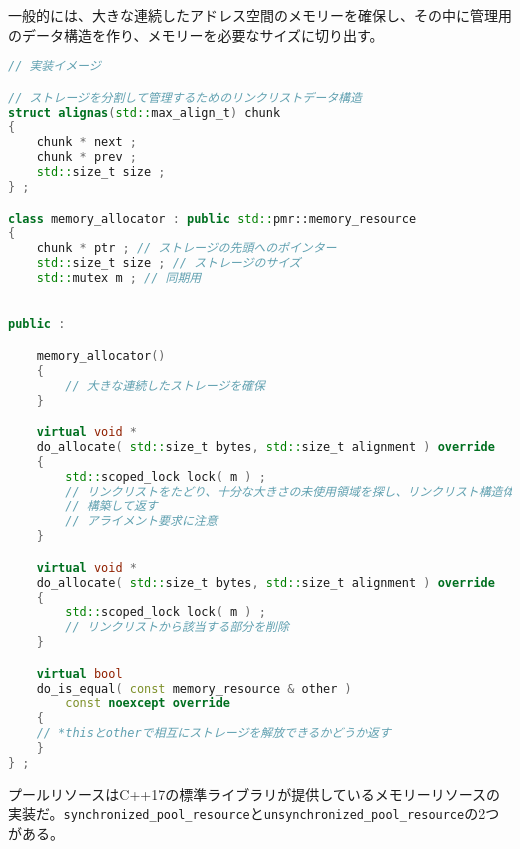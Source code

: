 一般的には、大きな連続したアドレス空間のメモリーを確保し、その中に管理用のデータ構造を作り、メモリーを必要なサイズに切り出す。

\begin{lstlisting}[language=C++]
// 実装イメージ

// ストレージを分割して管理するためのリンクリストデータ構造
struct alignas(std::max_align_t) chunk
{
    chunk * next ;
    chunk * prev ;
    std::size_t size ;
} ;

class memory_allocator : public std::pmr::memory_resource
{
    chunk * ptr ; // ストレージの先頭へのポインター
    std::size_t size ; // ストレージのサイズ
    std::mutex m ; // 同期用

    
public :

    memory_allocator()
    {
        // 大きな連続したストレージを確保
    }

    virtual void * 
    do_allocate( std::size_t bytes, std::size_t alignment ) override
    {
        std::scoped_lock lock( m ) ; 
        // リンクリストをたどり、十分な大きさの未使用領域を探し、リンクリスト構造体を
        // 構築して返す
        // アライメント要求に注意
    }

    virtual void * 
    do_allocate( std::size_t bytes, std::size_t alignment ) override
    {
        std::scoped_lock lock( m ) ;
        // リンクリストから該当する部分を削除
    }

    virtual bool 
    do_is_equal( const memory_resource & other )
        const noexcept override
    { 
    // *thisとotherで相互にストレージを解放できるかどうか返す
    }
} ;
\end{lstlisting}

%

プールリソースはC++17の標準ライブラリが提供しているメモリーリソースの実装だ。\lstinline!synchronized_pool_resource!と\lstinline!unsynchronized_pool_resource!の2つがある。

%

